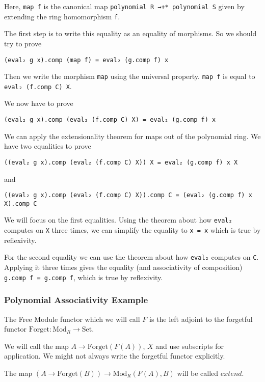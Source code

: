 \documentclass[12pt]{article} %
\theoremstyle{definition}
\theoremstyle{definition}
\theoremstyle{definition}
\theoremstyle{definition}
\begin{document}
Here, \lstinline{map f} is the canonical map \lstinline{polynomial R →+* polynomial S}
given by extending the ring homomorphism \lstinline{f}.

The first step is to write this equality as an equality of morphisms. So we should try to prove
\begin{lstlisting}
(eval₂ g x).comp (map f) = eval₂ (g.comp f) x
\end{lstlisting}

Then we write the morphism \lstinline{map} using the universal property. 
\lstinline{map f} is equal to \lstinline {eval₂ (f.comp C) X}.

We now have to prove
\begin{lstlisting}
(eval₂ g x).comp (eval₂ (f.comp C) X) = eval₂ (g.comp f) x
\end{lstlisting}

We can apply the extensionality theorem for maps out of the polynomial ring.
We have two equalities to prove
\begin{lstlisting}
((eval₂ g x).comp (eval₂ (f.comp C) X)) X = eval₂ (g.comp f) x X
\end{lstlisting}
and 
\begin{lstlisting}
((eval₂ g x).comp (eval₂ (f.comp C) X)).comp C = (eval₂ (g.comp f) x X).comp C
\end{lstlisting}

We will focus on the first equalities. Using the theorem about how \lstinline{eval₂}
computes on \lstinline{X} three times, we can simplify the equality to \lstinline{x = x} which is true 
by reflexivity.

For the second equality we can use the theorem about how \lstinline{eval₂}
computes on \lstinline{C}. Applying it three times gives the equality
(and associativity of composition) \lstinline{g.comp f = g.comp f}, which is true by reflexivity.

\subsubsection{Polynomial Associativity Example}

The Free Module functor which we will call $F$ is the left adjoint to the forgetful 
functor $\text{Forget} : \text{Mod}_R \to \text{Set}$.

We will call the map $A \to \text{Forget}(F(A))$, $X$ and use subscripts for application.
We might not always write the forgetful functor explicitly.

The map $(A \to \text{Forget}(B)) \to {\text{Mod}_R}(F(A), B)$ will be called $extend$.
\end{document}
